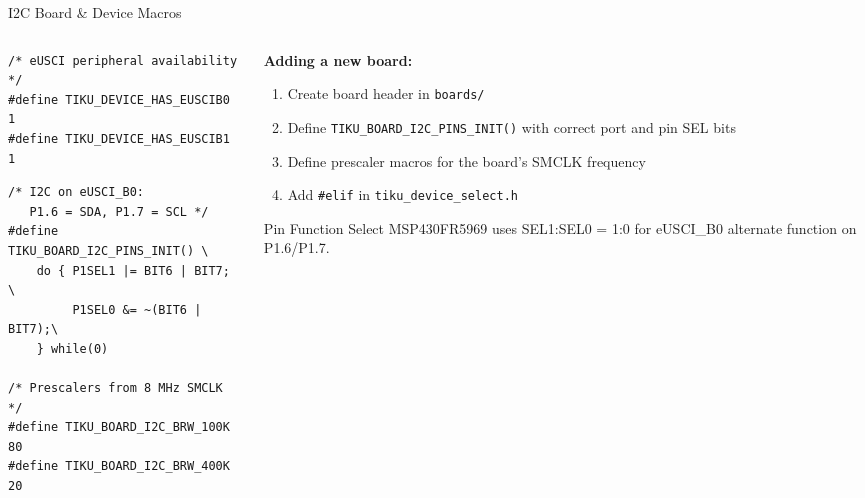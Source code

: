 \documentclass[aspectratio=169, 10pt]{beamer}
\begin{document}
\begin{frame}[fragile]{I2C Board \& Device Macros}
\begin{columns}[T]
\begin{column}{0.48\textwidth}
\begin{lstlisting}[style=cstyle,
  title={devices/tiku\_device\_fr5969.h}]
/* eUSCI peripheral availability */
#define TIKU_DEVICE_HAS_EUSCIB0 1
#define TIKU_DEVICE_HAS_EUSCIB1 1
\end{lstlisting}

\begin{lstlisting}[style=cstyle,
  title={boards/tiku\_board\_fr5969\_launchpad.h}]
/* I2C on eUSCI_B0:
   P1.6 = SDA, P1.7 = SCL */
#define TIKU_BOARD_I2C_PINS_INIT() \
    do { P1SEL1 |= BIT6 | BIT7; \
         P1SEL0 &= ~(BIT6 | BIT7);\
    } while(0)

/* Prescalers from 8 MHz SMCLK */
#define TIKU_BOARD_I2C_BRW_100K 80
#define TIKU_BOARD_I2C_BRW_400K 20
\end{lstlisting}
\end{column}

\begin{column}{0.48\textwidth}
\textbf{Adding a new board:}
\begin{enumerate}
  \item Create board header in \texttt{boards/}
  \item Define \texttt{TIKU\_BOARD\_I2C\_PINS\_INIT()}
        with correct port and pin SEL bits
  \item Define prescaler macros for the board's
        SMCLK frequency
  \item Add \texttt{\#elif} in \texttt{tiku\_device\_select.h}
\end{enumerate}

\vspace{0.5em}
\begin{block}{Pin Function Select}
MSP430FR5969 uses SEL1:SEL0 = 1:0 for
eUSCI\_B0 alternate function on P1.6/P1.7.
\end{block}
\end{column}
\end{columns}
\end{frame}
\end{document}

